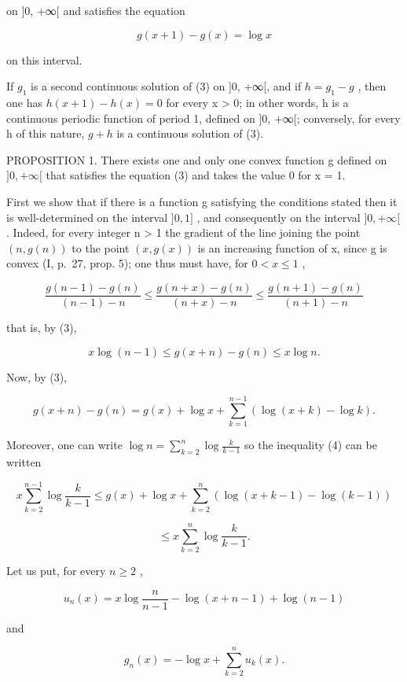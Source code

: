 on {]}0, +∞{[} and satisfies the equation

\[
g (x + 1) - g (x) = \log x\tag{3}
\]

on this interval.

If \(g_{1}\) is a second continuous solution of (3) on {]}0, +∞{[}, and if \(h = g_{1} - g\) , then one has \(h(x + 1) - h(x) = 0\) for every x \textgreater{} 0; in other words, h is a continuous periodic function of period 1, defined on {]}0, +∞{[}; conversely, for every h of this nature, \(g + h\) is a continuous solution of (3).

PROPOSITION 1. There exists one and only one convex function g defined on \(]0, +\infty[\) that satisfies the equation (3) and takes the value 0 for x = 1.

First we show that if there is a function g satisfying the conditions stated then it is well-determined on the interval \(]0, 1]\) , and consequently on the interval \(]0, +\infty[\) . Indeed, for every integer n \textgreater{} 1 the gradient of the line joining the point \((n, g(n))\) to the point \((x, g(x))\) is an increasing function of x, since g is convex (I, p.~27, prop. 5); one thus must have, for \(0 < x \leqslant 1\) ,

\[
\frac {g (n - 1) - g (n)}{(n - 1) - n} \leqslant \frac {g (n + x) - g (n)}{(n + x) - n} \leqslant \frac {g (n + 1) - g (n)}{(n + 1) - n}
\]

that is, by (3),

\[
x \log (n - 1) \leqslant g (x + n) - g (n) \leqslant x \log n.\tag{4}
\]

Now, by (3),

\[
g (x + n) - g (n) = g (x) + \log x + \sum_ {k = 1} ^ {n - 1} (\log (x + k) - \log k).
\]

Moreover, one can write \(\log n = \sum_{k=2}^{n} \log \frac{k}{k-1}\) so the inequality (4) can be written

\[
x \sum_ {k = 2} ^ {n - 1} \log \frac {k}{k - 1} \leqslant g (x) + \log x + \sum_ {k = 2} ^ {n} (\log (x + k - 1) - \log (k - 1))
\]

\[
\leqslant x \sum_ {k = 2} ^ {n} \log \frac {k}{k - 1}.
\]

Let us put, for every \(n \geqslant 2\) ,

\[
u _ {n} (x) = x \log {\frac {n}{n - 1}} - \log (x + n - 1) + \log (n - 1)\tag{5}
\]

and

\[
g _ {n} (x) = - \log x + \sum_ {k = 2} ^ {n} u _ {k} (x).
\]

